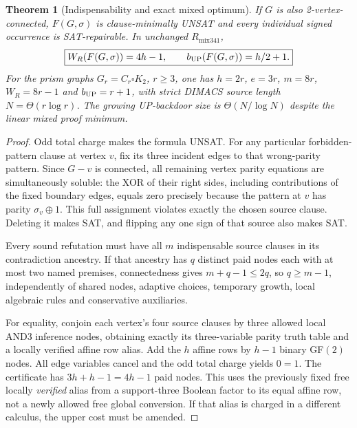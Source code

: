 \documentclass[11pt]{article}
\newtheorem{theorem}{Theorem}
\begin{document}
\begin{theorem}[Indispensability and exact mixed optimum]
If $G$ is also 2-vertex-connected, $F(G,\sigma)$ is clause-minimally UNSAT and every individual signed occurrence is SAT-repairable. In unchanged $R_{\mathrm{mix341}}$,
\[
\boxed{W_R(F(G,\sigma))=4h-1,\qquad b_{\rm UP}(F(G,\sigma))=h/2+1.}
\]
For the prism graphs $G_r=C_r\square K_2$, $r\ge3$, one has $h=2r$, $e=3r$, $m=8r$, $W_R=8r-1$ and $b_{\rm UP}=r+1$, with strict DIMACS source length $N=\Theta(r\log r)$. The growing UP-backdoor size is $\Theta(N/\log N)$ despite the linear mixed proof minimum.
\end{theorem}
\begin{proof}
Odd total charge makes the formula UNSAT. For any particular forbidden-pattern clause at vertex $v$, fix its three incident edges to that wrong-parity pattern. Since $G-v$ is connected, all remaining vertex parity equations are simultaneously soluble: the XOR of their right sides, including contributions of the fixed boundary edges, equals zero precisely because the pattern at $v$ has parity $\sigma_v\oplus1$. This full assignment violates exactly the chosen source clause. Deleting it makes SAT, and flipping any one sign of that source also makes SAT.

Every sound refutation must have all $m$ indispensable source clauses in its contradiction ancestry. If that ancestry has $q$ distinct paid nodes each with at most two named premises, connectedness gives $m+q-1\le 2q$, so $q\ge m-1$, independently of shared nodes, adaptive choices, temporary growth, local algebraic rules and conservative auxiliaries.

For equality, conjoin each vertex's four source clauses by three allowed local AND3 inference nodes, obtaining exactly its three-variable parity truth table and a locally verified affine row alias. Add the $h$ affine rows by $h-1$ binary GF$(2)$ nodes. All edge variables cancel and the odd total charge yields $0=1$. The certificate has $3h+h-1=4h-1$ paid nodes. This uses the previously fixed free locally \emph{verified} alias from a support-three Boolean factor to its equal affine row, not a newly allowed free global conversion. If that alias is charged in a different calculus, the upper cost must be amended.
\end{proof}
\end{document}
